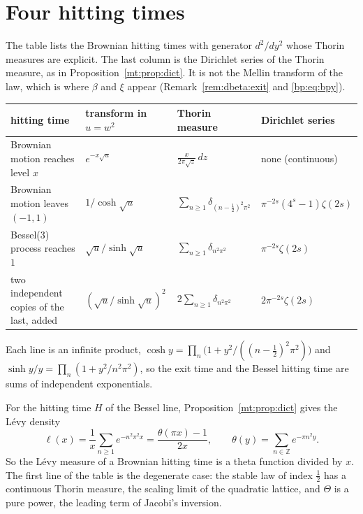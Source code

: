 \section{Four hitting times}\label{mt:sec:table}
The table lists the Brownian hitting times with generator $d^2/dy^2$ whose Thorin measures are explicit. The last column is the Dirichlet series of the Thorin measure, as in Proposition~\ref{mt:prop:dict}. It is not the Mellin transform of the law, which is where $\beta$ and $\xi$ appear (Remark~\ref{rem:dbeta:exit} and \eqref{bp:eq:bpy}).
\begin{center}
\small
\begin{tabular}{p{}p{}p{}p{}}
\toprule
hitting time & transform in $u=w^2$ & Thorin measure & Dirichlet series\\
\midrule
Brownian motion reaches level $x$ & $e^{-x\sqrt u}$ & $\frac{x}{2\pi\sqrt z}\,dz$ & none (continuous)\\
\addlinespace
Brownian motion leaves $(-1,1)$ & $1/\cosh\sqrt u$ & $\sum_{n\ge1}\delta_{(n-\frac12)^2\pi^2}$ & $\pi^{-2s}(4^{s}-1)\zeta(2s)$\\
\addlinespace
Bessel(3) process reaches $1$ & $\sqrt u/\sinh\sqrt u$ & $\sum_{n\ge1}\delta_{n^2\pi^2}$ & $\pi^{-2s}\zeta(2s)$\\
\addlinespace
two independent copies of the last, added & $(\sqrt u/\sinh\sqrt u)^2$ & $2\sum_{n\ge1}\delta_{n^2\pi^2}$ & $2\pi^{-2s}\zeta(2s)$\\
\bottomrule
\end{tabular}
\end{center}
Each line is an infinite product, $\cosh y=\prod_n\big(1+y^2/((n-\frac12)^2\pi^2)\big)$ and $\sinh y/y=\prod_n(1+y^2/n^2\pi^2)$, so the exit time and the Bessel hitting time are sums of independent exponentials.

For the hitting time $H$ of the Bessel line, Proposition~\ref{mt:prop:dict} gives the L\'evy density
\[
\ell(x)=\frac1x\sum_{n\ge1}e^{-n^2\pi^2x}=\frac{\theta(\pi x)-1}{2x},\qquad\theta(y)=\sum_{n\in\mathbb Z}e^{-\pi n^2y}.
\]
So the L\'evy measure of a Brownian hitting time is a theta function divided by $x$. The first line of the table is the degenerate case: the stable law of index $\frac12$ has a continuous Thorin measure, the scaling limit of the quadratic lattice, and $\Theta$ is a pure power, the leading term of Jacobi's inversion.


